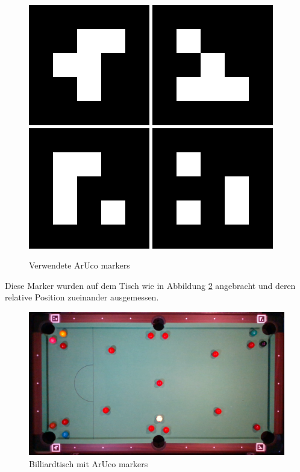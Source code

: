 \begin{figure}[h!]
    \includegraphics[width=0.2\linewidth]{../common/resources/aruco/marker_0.png}
    \includegraphics[width=0.2\linewidth]{../common/resources/aruco/marker_1.png}
    \includegraphics[width=0.2\linewidth]{../common/resources/aruco/marker_2.png}
    \includegraphics[width=0.2\linewidth]{../common/resources/aruco/marker_3.png}
    \caption{Verwendete ArUco markers}
    \label{fig:used_aruco_markers}
\end{figure}

Diese Marker wurden auf dem Tisch wie in Abbildung \ref{fig:table_with_aruco_markers} angebracht und deren relative
Position zueinander ausgemessen.

\begin{figure}[h!]
    \begin{center}
    \includegraphics[width=0.6\linewidth]{../common/resources/coordinate_systems/table_with_markers.png}
    \end{center}
    \caption{Billiardtisch mit ArUco markers}
    \label{fig:table_with_aruco_markers}
\end{figure}

